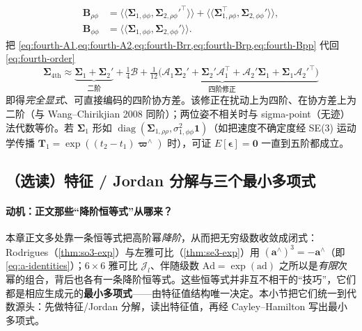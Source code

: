 \begin{derivation}
\begin{align}
  \label{eq:fourth-Brr}\\
  \mathbf{B}_{\rho\phi}&=\langle\!\langle\boldsymbol{\Sigma}_{1,\phi\phi},\boldsymbol{\Sigma}_{2,\rho\phi}'^\top\rangle\!\rangle+\langle\!\langle\boldsymbol{\Sigma}_{1,\rho\phi}^\top,\boldsymbol{\Sigma}_{2,\phi\phi}'\rangle\!\rangle,
  \label{eq:fourth-Brp}\\
  \mathbf{B}_{\phi\phi}&=\langle\!\langle\boldsymbol{\Sigma}_{1,\phi\phi},\boldsymbol{\Sigma}_{2,\phi\phi}'\rangle\!\rangle.
  \label{eq:fourth-Bpp}
\end{align}
把 \cref{eq:fourth-A1,eq:fourth-A2,eq:fourth-Brr,eq:fourth-Brp,eq:fourth-Bpp} 代回 \cref{eq:fourth-order}
\[
  \boldsymbol{\Sigma}_{4\text{th}}\approx\underbrace{\boldsymbol{\Sigma}_1+\boldsymbol{\Sigma}_2'}_{\text{二阶}}
  +\underbrace{\tfrac14\boldsymbol{\mathcal{B}}+\tfrac1{12}\big(\boldsymbol{\mathcal{A}}_1\boldsymbol{\Sigma}_2'+\boldsymbol{\Sigma}_2'\boldsymbol{\mathcal{A}}_1^\top+\boldsymbol{\mathcal{A}}_2'\boldsymbol{\Sigma}_1+\boldsymbol{\Sigma}_1\boldsymbol{\mathcal{A}}_2'^\top\big)}_{\text{四阶修正}}
\]
即得\emph{完全显式}、可直接编码的四阶协方差。该修正在扰动上为四阶、在协方差上为二阶（与 Wang--Chirikjian 2008 同阶）；两位姿不相关时与 sigma-point（无迹）法代数等价\cite{barfoot2024state}。若 $\boldsymbol{\Sigma}_1$ 形如 $\operatorname{diag}(\boldsymbol{\Sigma}_{1,\rho\rho},\sigma_{1,\phi\phi}^2\mathbf{1})$（如把速度不确定度经 SE(3) 运动学传播 $\mathbf{T}_1=\exp((t_2-t_1)\boldsymbol{\varpi}^\wedge)$ 时），可证 $E[\boldsymbol{\epsilon}]=\mathbf{0}$ 一直到五阶都成立。
\end{derivation}

\subsection{（选读）特征 / Jordan 分解与三个最小多项式}
\label{subsec:minimal-poly}

\paragraph{动机：正文那些“降阶恒等式”从哪来？}本章正文多处靠一条恒等式把高阶幂\emph{降阶}，从而把无穷级数收敛成闭式：Rodrigues（\cref{thm:so3-exp}）与左雅可比（\cref{thm:se3-exp}）用 $(\mathbf{a}^\wedge)^3=-\mathbf{a}^\wedge$（即 \cref{eq:a-identities}）；$6\times6$ 雅可比 $\boldsymbol{\mathcal{J}}_l$、伴随级数 $\mathrm{Ad}=\exp(\mathrm{ad})$ 之所以是\emph{有限}次幂的组合，背后也各有一条降阶恒等式。这些恒等式并非互不相干的“技巧”，它们都是相应生成元的\textbf{最小多项式}——由特征值结构唯一决定。本小节把它们统一到代数源头：先做特征/Jordan 分解，读出特征值，再经 Cayley--Hamilton 写出最小多项式。

